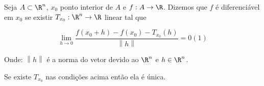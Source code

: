 \documentclass{book}
\begin{document}
\begin{defn}
    Seja $A \subset \R^n$, $x_0$ ponto interior de $A$ e $f:A \to \R$. Dizemos que $f$ \'e diferenci\'avel em $x_0$ se existir $T_{x_0 } :\R^n  \to \R$ linear tal que

\[\boxed{
    \mathop {\lim }\limits_{h \to 0} \frac{{f\left( {x_0  + h} \right) - f\left( {x_0 } \right) - T_{x_0 } \left( h \right)}}{{\left\| h \right\|}} = 0} \left( 1 \right)
\]

    Onde: $\left\| h \right\|$ \'e a norma do vetor devido ao $\R^n$ e $h \in \R^n$.
\end{defn}

\newpage 

\begin{teo}
Se existe ${T_{x_0 } }$ nas condi\c c\~oes acima ent\~ao ela \'e \'unica.
\end{teo}
\end{document}
